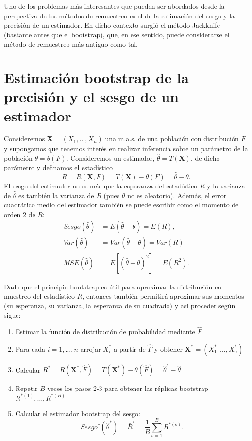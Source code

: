 \documentclass[
]{book}
\theoremstyle{break}
\theoremstyle{definition}
\theoremstyle{definition}
\theoremstyle{definition}
\theoremstyle{definition}
\theoremstyle{remark}
\begin{document}
Uno de los problemas más interesantes que pueden ser abordados desde la
perspectiva de los métodos de remuestreo es el de la estimación del
sesgo y la precisión de un estimador. En dicho contexto surgió el método
Jackknife (bastante antes que el bootstrap), que, en ese sentido, puede
considerarse el método de remuestreo más antiguo como tal.

\hypertarget{prec-sesgo-boot}{%
\section{Estimación bootstrap de la precisión y el sesgo de un estimador}\label{prec-sesgo-boot}}

Consideremos \(\mathbf{X}=\left( X_1,\ldots ,X_n \right)\) una
m.a.s. de una población con distribución \(F\) y supongamos que tenemos
interés en realizar inferencia sobre un parámetro de la población
\(\theta =\theta \left( F \right)\). Consideremos un estimador,
\(\hat{\theta}=T\left( \mathbf{X} \right)\), de dicho parámetro y
definamos el estadístico
\[R=R\left( \mathbf{X}, F \right) = T\left( \mathbf{X} \right) 
- \theta \left( F \right) = \hat{\theta} - \theta.\]
El sesgo del estimador no es más que la esperanza del
estadístico \(R\) y la varianza de \(\hat{\theta}\) es también la varianza
de \(R\) (pues \(\theta\) no es aleatorio). Además, el error cuadrático
medio del estimador también se puede escribir como el momento de orden 2
de \(R\):
\[\begin{aligned}
Sesgo\left( \hat{\theta} \right) &= E\left( \hat{\theta}-\theta \right)
=E\left( R \right), \\
Var\left( \hat{\theta} \right) &= Var\left( \hat{\theta}-\theta \right)
=Var\left( R \right), \\
MSE\left( \hat{\theta} \right) &= E\left[ \left( \hat{\theta}-\theta \right)
^2\right] =E\left( R^2 \right).
\end{aligned}\]

Dado que el principio bootstrap es útil para aproximar la distribución
en muestreo del estadístico \(R\), entonces también permitirá aproximar
sus momentos (su esperanza, su varianza, la esperanza de su cuadrado) y
así proceder según sigue:

\begin{enumerate}
\def\labelenumi{\arabic{enumi}.}
\item
  Estimar la función de distribución de probabilidad mediante \(\hat{F}\)
\item
  Para cada \(i=1,\ldots ,n\) arrojar \(X_i^{\ast}\) a partir de
  \(\hat{F}\) y obtener
  \(\mathbf{X}^{\ast}=\left( X_1^{\ast}, \ldots ,X_n^{\ast} \right)\)
\item
  Calcular \(R^{\ast}=R\left( \mathbf{X}^{\ast},\hat{F} \right) =T\left( \mathbf{X}^{\ast} \right) -\theta \left( \hat{F} \right) = \hat{\theta}^{\ast}- \hat \theta\)
\item
  Repetir \(B\) veces los pasos 2-3 para obtener las réplicas bootstrap
  \(R^{\ast (1)}, \ldots, R^{\ast (B)}\)
\item
  Calcular el estimador bootstrap del sesgo:
  \[Sesgo^{\ast}\left( \hat{\theta}^{\ast} \right) =\bar{R}^{\ast}=\frac{1
  }{B}\sum_{b=1}^{B}R^{\ast (b)}.\]
\end{enumerate}
\end{document}
